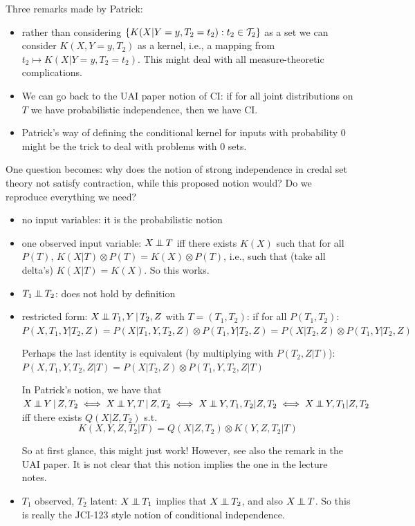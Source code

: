 Three remarks made by Patrick:
\begin{itemize}
  \item rather than considering $\{K(X|Y=y,T_2=t_2) : t_2 \in \mathcal{T}_2\}$ as a set we can consider
$K(X,Y=y,T_2)$ as a kernel, i.e., a mapping from $t_2 \mapsto K(X|Y=y,T_2=t_2)$.
This might deal with all measure-theoretic complications.
\item We can go back to the UAI paper notion of CI: if for all joint distributions on $T$ we have
  probabilistic independence, then we have CI.
\item Patrick's way of defining the conditional kernel for inputs with probability 0 might be the trick to deal with problems with 0 sets.
\end{itemize}
One question becomes: why does the notion of strong independence in credal set theory not satisfy contraction, while this proposed notion would?
Do we reproduce everything we need?
\begin{itemize}
  \item no input variables: it is the probabilistic notion
  \item one observed input variable: $X \operatorname*{\perp\mkern-11mu\perp} T$ iff there exists $K(X)$ such that for all $P(T)$, $K(X|T) \otimes P(T) = K(X) \otimes P(T)$, i.e., such that (take all delta's) $K(X|T) = K(X)$. So this works.
  \item $T_1 \operatorname*{\perp\mkern-11mu\perp} T_2$: does not hold by definition
  \item restricted form: $X \operatorname*{\perp\mkern-11mu\perp} T_1,Y \operatorname*{|} T_2,Z$ with $T=(T_1,T_2)$: if for all $P(T_1,T_2)$: 
    $P(X,T_1,Y|T_2,Z) = P(X|T_1,Y,T_2,Z) \otimes P(T_1,Y|T_2,Z) = P(X|T_2,Z) \otimes P(T_1,Y|T_2,Z)$

    Perhaps the last identity is equivalent (by multiplying with $P(T_2,Z|T)$):
    $P(X,T_1,Y,T_2,Z|T) = P(X|T_2,Z) \otimes P(T_1,Y,T_2,Z|T)$

    In Patrick's notion, we have that
    $X \Indep Y \given Z,T_2 \iff X \Indep Y,T \given Z,T_2 \iff X \Indep Y,T_1,T_2 | Z,T_2 \iff X \Indep Y,T_1 | Z,T_2$
    iff there exists $Q(X|Z,T_2)$ s.t.\
    \[ K(X,Y,Z,T_2|T) = Q(X|Z,T_2) \otimes K(Y,Z,T_2|T) \]

    So at first glance, this might just work! However, see also the remark in the UAI paper. 
    It is not clear that this notion implies the one in the lecture notes.
  \item $T_1$ observed, $T_2$ latent: $X \operatorname*{\perp\mkern-11mu\perp} T_1$ implies that $X \operatorname*{\perp\mkern-11mu\perp} T_2$, and also $X \operatorname*{\perp\mkern-11mu\perp} T$.
    So this is really the JCI-123 style notion of conditional independence.
\end{itemize}

